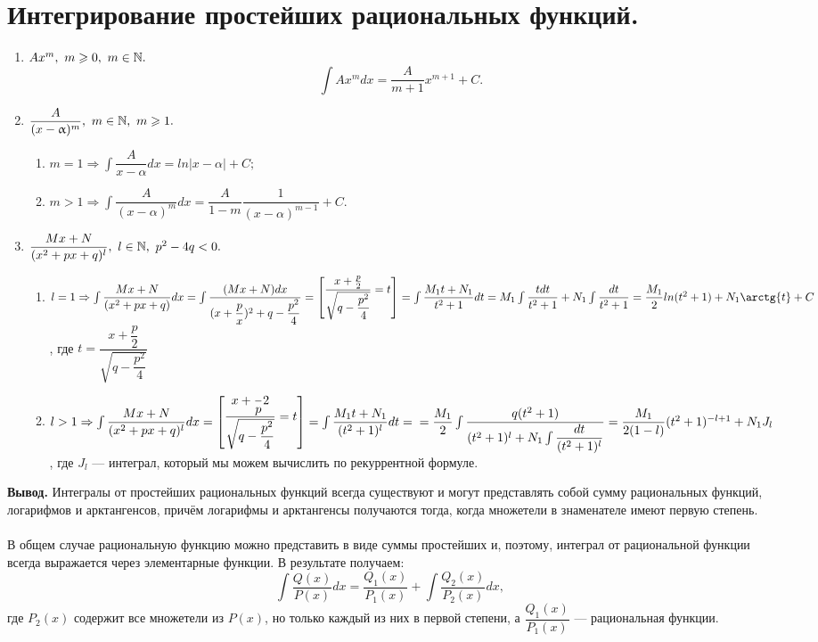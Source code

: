 \section{Интегрирование простейших рациональных функций.}
\begin{enumerate}
	\item $ Ax^m,\ m \geqslant 0,\ m \in {\mathbb{N}}.$
	$$\int\limits Ax^m dx = \frac{A}{m + 1} x^{m + 1} + C.$$
	\item $ \dfrac{A}{(x - \upalpha)^m},\ m \in {\mathbb{N}},\ m \geqslant 1.$
	\begin{enumerate}
		\item $ m = 1\Rightarrow \int\limits \dfrac{A}{x - \alpha} dx = ln|x - \alpha| + C;$
		\item $ m > 1\Rightarrow \int\limits \dfrac{A}{(x - \alpha)^m} dx = \dfrac{A}{1 - m} \dfrac{1}{(x - \alpha)^{m - 1}} + C.$
	\end{enumerate}
	\item $ \dfrac{Mx + N}{(x^2 + px + q)^l},\ l \in {\mathbb{N}},\ p^2 - 4q < 0.$
	\begin{enumerate}
		\item  $ l = 1\Ra \int\limits \dfrac{Mx + N}{(x^2 + px + q)} dx = \int\limits \dfrac{(Mx + N)dx}{(x + \dfrac{p}{x})^2 + q - \dfrac{p^2}{4}} = \begin{bmatrix} \dfrac{x + \frac{p}{2}}{\sqrt{q - \dfrac{p^2}{4}}} = t \end{bmatrix} = \int\limits \dfrac{M_1 t + N_1}{t^2 + 1} dt = M_1 \int\limits \dfrac{tdt}{t^2 + 1} + N_1 \int\limits \dfrac{dt}{t^2 + 1} = \dfrac{M_1}{2} ln(t^2 + 1) + N_1\arctg{t} + C $, где $ t = \dfrac{x + \dfrac{p}{2}}{\sqrt{q - \dfrac{p^2}{4}}} $
		\item $ l > 1\Rightarrow \int\limits \dfrac{Mx + N}{(x^2 + px +q)^l}dx = \begin{bmatrix} \dfrac{x + \dfrac{}p{2}}{\sqrt{q - \dfrac{p^2}{4}}} = t \end{bmatrix} = \int\limits \dfrac{M_1t + N_1}{(t^2 + 1)^l} dt =\\= \dfrac{M_1}{2} \int\limits \dfrac{q(t^2 + 1)}{(t^2 + 1)^l + N_1 \int\limits \dfrac{dt}{(t^2 + 1)^l}} = \dfrac{M_1}{2(1 - l)} (t^2 +1)^{-l + 1} + N_1 J_l$, где $ J_l $ --- интеграл, который мы можем вычислить по рекуррентной формуле.
	\end{enumerate}
\end{enumerate}
\textbf{Вывод.}
Интегралы от простейших рациональных функций всегда существуют и могут представлять собой сумму рациональных функций, логарифмов и арктангенсов, причём логарифмы и арктангенсы получаются тогда, когда множетели в знаменателе имеют первую степень. \\\\
В общем случае рациональную функцию можно представить в виде суммы простейших и, поэтому, интеграл от рациональной функции всегда выражается через элементарные функции. В результате получаем:
$$ \int\limits \frac{Q(x)}{P(x)} dx = \frac{Q_1(x)}{P_1(x)} + \int\limits \frac{Q_2(x)}{P_2(x)} dx, $$
где $ P_2(x)$ содержит все множетели из $P(x)$, но только каждый из них в первой степени, а $\dfrac{Q_1(x)}{P_1(x)} $ --- рациональная функции.
